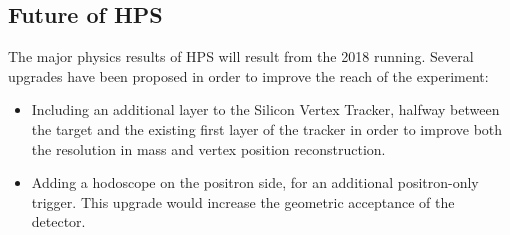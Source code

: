 \documentclass[b1]{sciposter}
\begin{document}
\begin{multicols}{3}
        \section*{Future of HPS}
%

        The major physics results of HPS will result from the 2018 running. %
        Several upgrades have been proposed in order to improve the reach of the experiment:  
     	\begin{itemize}
	\item Including an additional layer to the Silicon Vertex Tracker, halfway between the target and the existing first layer of the tracker in order to improve both the resolution in mass and vertex position reconstruction.  
	\item Adding a hodoscope on the positron side, for an additional positron-only trigger.  This upgrade would increase the geometric acceptance of the detector.  
	\end{itemize}
	
\end{multicols}
\end{document}
